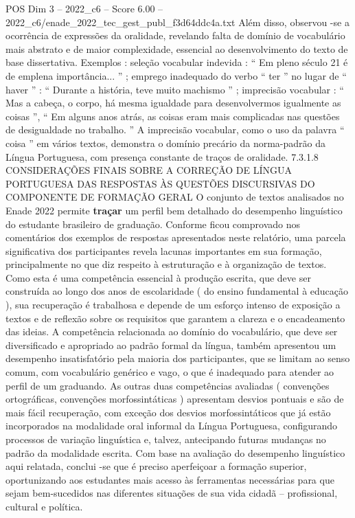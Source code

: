 \begin{textsample}{POS Dim 3 – 2022\_c6 – Score 6.00 – 2022\_c6/enade\_2022\_tec\_gest\_publ\_f3d64ddc4a.txt}
Além disso, observou -se a ocorrência de expressões da oralidade, revelando falta de domínio de vocabulário mais abstrato e de maior complexidade, essencial ao desenvolvimento do texto de base dissertativa.
Exemplos : seleção vocabular indevida : “ Em pleno século 21 é de emplena importância... ” ; emprego inadequado do verbo “ ter ” no lugar de “ haver ” : “ Durante a história, teve muito machismo ” ; imprecisão vocabular : “ Mas a cabeça, o corpo, há mesma igualdade para desenvolvermos igualmente as coisas ”, “ Em alguns anos atrás, as coisas eram mais complicadas nas questões de desigualdade no trabalho. ” A imprecisão vocabular, como o uso da palavra “ coisa ” em vários textos, demonstra o domínio precário da norma-padrão da Língua Portuguesa, com presença constante de traços de oralidade. 7.3.1.8 CONSIDERAÇÕES FINAIS SOBRE A CORREÇÃO DE LÍNGUA PORTUGUESA DAS RESPOSTAS ÀS QUESTÕES DISCURSIVAS DO COMPONENTE DE FORMAÇÃO GERAL O conjunto de textos analisados no Enade 2022 permite \textbf{traçar} um perfil bem detalhado do desempenho linguístico do estudante brasileiro de graduação.
Conforme ficou comprovado nos comentários dos exemplos de respostas apresentados neste relatório, uma parcela significativa dos participantes revela lacunas importantes em sua formação, principalmente no que diz respeito à estruturação e à organização de textos.
Como esta é uma competência essencial à produção escrita, que deve ser construída ao longo dos anos de escolaridade ( do ensino fundamental à educação ), sua recuperação é trabalhosa e depende de um esforço intenso de exposição a textos e de reflexão sobre os requisitos que garantem a clareza e o encadeamento das ideias.
A competência relacionada ao domínio do vocabulário, que deve ser diversificado e apropriado ao padrão formal da língua, também apresentou um desempenho insatisfatório pela maioria dos participantes, que se limitam ao senso comum, com vocabulário genérico e vago, o que é inadequado para atender ao perfil de um graduando.
As outras duas competências avaliadas ( convenções ortográficas, convenções morfossintáticas ) apresentam desvios pontuais e são de mais fácil recuperação, com exceção dos desvios morfossintáticos que já estão incorporados na modalidade oral informal da Língua Portuguesa, configurando processos de variação linguística e, talvez, antecipando futuras mudanças no padrão da modalidade escrita.
Com base na avaliação do desempenho linguístico aqui relatada, conclui -se que é preciso aperfeiçoar a formação superior, oportunizando aos estudantes mais acesso às ferramentas necessárias para que sejam bem-sucedidos nas diferentes situações de sua vida cidadã – profissional, cultural e política.

\end{textsample}
